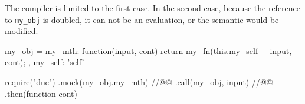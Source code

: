 The compiler is limited to the first case.
In the second case, because the reference to \texttt{my_obj} is doubled, it can not be an evaluation, or the semantic would be modified.

\begin{code}[js, %
             caption={Result of the transformation of the}, %
             label={lst:mock}] %
my_obj = {
  my_mth: function(input, cont) {
    return my_fn(this.my_self + input, cont);
  },
  my_self: 'self'
}

require("due")
.mock(my_obj.my_mth) //@\label{lst:mock:mock}@
.call(my_obj, input) //@\label{lst:mock:call}@
.then(function cont)
\end{code}


































